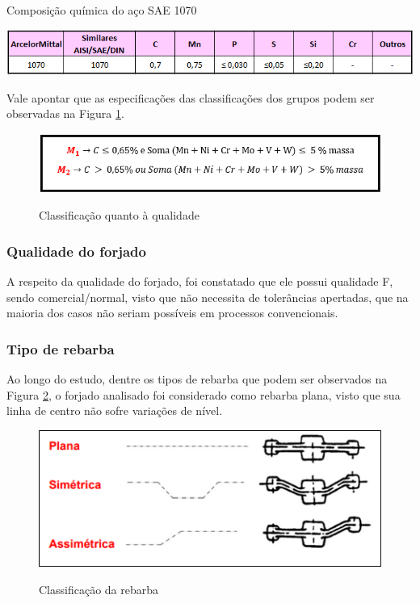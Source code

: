 \documentclass[deposito, acronym, symbols]{fei}
\begin{document}
\begin{table}[!htb]
 \centering
    \caption{Composição química do aço SAE 1070}
    \includegraphics[width=0.8\linewidth]{Imagens/tabela arcelor.png}
    \label{tab:tab arce}
 \end{table}

Vale apontar que as especificações das classificações dos grupos podem ser observadas na Figura \ref{fig:M2}.

\begin{figure}[!htp]
    \centering
    \caption{Classificação quanto à qualidade}
    \includegraphics[width=0.6\linewidth]{Imagens/Captura de tela 2023-11-16 180524.png}
    \label{fig:M2}
\end{figure}

\subsubsection{Qualidade do forjado}

A respeito da qualidade do forjado, foi constatado que ele possui qualidade F, sendo comercial/normal, visto que não necessita de tolerâncias apertadas, que na maioria dos casos não seriam possíveis em processos convencionais. 

\subsubsection{Tipo de rebarba}

Ao longo do estudo, dentre os tipos de rebarba que podem ser observados na Figura \ref{fig:rebarba}, o forjado analisado foi considerado como rebarba plana, visto que sua linha de centro não sofre variações de nível.

\begin{figure}[!htp]
    \centering
    \caption{Classificação da rebarba}
    \includegraphics[width=0.6\linewidth]{Imagens/Imagem3.png}
    \label{fig:rebarba}
\end{figure}
\end{document}
